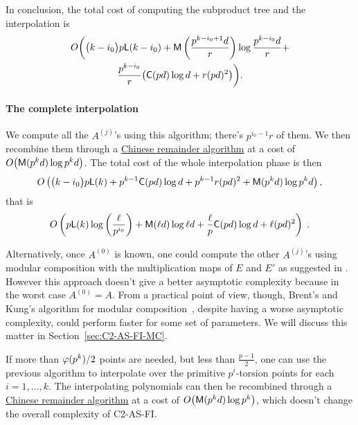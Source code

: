 In conclusion, the total cost of computing the subproduct tree and the
interpolation is
\begin{multline*}
  O\biggl(\bigl(k-i_0\bigr)p{\sf L}(k-i_0) + \mathsf{M}\left(\frac{p^{k-i_0+1}d}{r}\right)\log \frac{p^{k-i_0}d}{r} +\\
    \frac{p^{k-i_0}}{r}\bigl(\mathsf{C}(pd)\log d + r(pd)^2\bigr)\biggr)
  \text{.}
\end{multline*}


\paragraph{The complete interpolation}
We compute all the $A^{(j)}$'s using this algorithm; there's
$p^{i_0-1}r$ of them. We then recombine them through a
\hyperref[sec:chin-rema-algor]{Chinese remainder algorithm} at a cost
of $O\bigl(\mathsf{M}(p^kd)\log p^kd\bigr)$. The total cost of the
whole interpolation phase is then
\begin{multline*}
  O\left(\bigl(k-i_0\bigr) p{\sf L}(k) + p^{k-1}\mathsf{C}(pd)\log d +
    p^{k-1}r(pd)^2 + \mathsf{M}(p^kd)\log p^kd \right)\text{,}
\end{multline*}
that is
\begin{equation}
  \label{eq:interp}
  O\left(p{\sf L}(k)\log\left(\frac{\ell}{p^{i_0}}\right) + 
    \mathsf{M}(\ell d)\log\ell d +
    \frac{\ell}{p}\mathsf{C}(pd)\log d +
    \ell (pd)^2
  \right)
  \;\text{.}
\end{equation}

Alternatively, once $A^{(0)}$ is known, one could compute the other
$A^{(j)}$'s using modular composition with the multiplication maps of
$E$ and $E'$ as suggested in \cite{couveignes96}. However this
approach doesn't give a better asymptotic complexity because in the
worst case $A^{(0)}=A$. From a practical point of view, though,
Brent's and Kung's algorithm for modular
composition~\cite{brent+kung}, despite having a worse asymptotic
complexity, could perform faster for some set of parameters. We will
discuss this matter in Section~\ref{sec:C2-AS-FI-MC}.

If more than $\varphi(p^k)/2$ points are needed, but less than
$\frac{p-1}{2}$, one can use the previous algorithm to interpolate
over the primitive $p^i$-torsion points for each $i=1,\ldots,k$. The
interpolating polynomials can then be recombined through a
\hyperref[sec:chin-rema-algor]{Chinese remainder algorithm} at a cost
of $O\bigl(\mathsf{M}(p^kd)\log p^k\bigr)$, which doesn't change the
overall complexity of C2-AS-FI.


